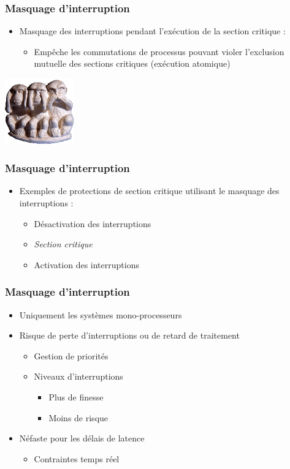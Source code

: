 \begin{frame}
\frametitle{Masquage d’interruption}
\begin{itemize}
\item Masquage des interruptions pendant l’exécution de la section critique :
\begin{itemize}
\item Empêche les commutations de processus pouvant violer l'exclusion mutuelle des sections critiques (exécution atomique)
\end{itemize}
\end{itemize}
\begin{center}
\includegraphics[width=3cm]{../illustration/singes.png} 
\end{center}
\end{frame}

\begin{frame}
\frametitle{Masquage d’interruption}
\begin{itemize}
\item Exemples de protections de section critique utilisant le masquage des interruptions :
\begin{itemize}
\item Désactivation des interruptions
\item \textit{Section critique}
\item Activation des interruptions 
\end{itemize}
\end{itemize}
\end{frame}

\begin{frame}
\frametitle{Masquage d’interruption}
\begin{itemize}
\item Uniquement les systèmes mono-processeurs
\item Risque de perte d'interruptions ou de retard de traitement
\begin{itemize}
\item Gestion de priorités
\item Niveaux d'interruptions
\begin{itemize}
\item Plus de finesse
\item Moins de risque
\end{itemize}
\end{itemize}
\item Néfaste pour les délais de latence
\begin{itemize}
\item Contraintes temps réel
\end{itemize}
\end{itemize}
\end{frame}

